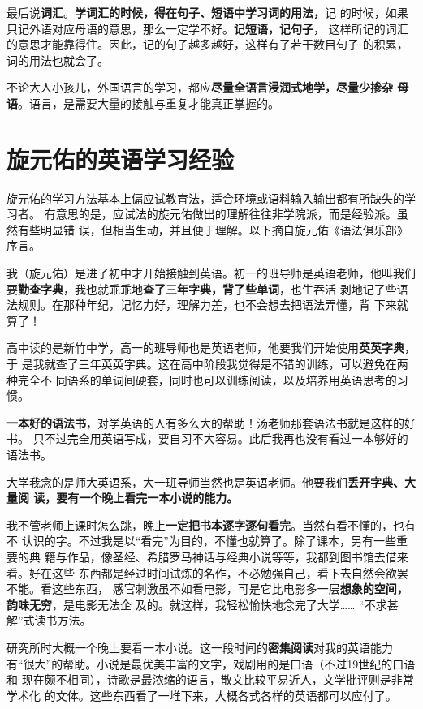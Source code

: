 最后说\textbf{词汇}。\textbf{学词汇的时候，得在句子、短语中学习词的用法，}记
的时候，如果只记外语对应母语的意思，那么一定学不好。\textbf{记短语，记句子}，
这样所记的词汇的意思才能靠得住。因此，记的句子越多越好，这样有了若干数目句子
的积累，词的用法也就会了。

不论大人小孩儿，外国语言的学习，都应\textbf{尽量全语言浸润式地学，尽量少掺杂
  母语}。语言，是需要大量的接触与重复才能真正掌握的。

\section*{旋元佑的英语学习经验}

旋元佑的学习方法基本上偏应试教育法，适合环境或语料输入输出都有所缺失的学习者。
有意思的是，应试法的旋元佑做出的理解往往非学院派，而是经验派。虽然有些明显错
误，但相当生动，并且便于理解。以下摘自旋元佑《语法俱乐部》序言。

我（旋元佑）是进了初中才开始接触到英语。初一的班导师是英语老师，他叫我们
要\textbf{勤查字典}，我也就乖乖地\textbf{查了三年字典，背了些单词}，也生吞活
剥地记了些语法规则。在那种年纪，记忆力好，理解力差，也不会想去把语法弄懂，背
下来就算了！

高中读的是新竹中学，高一的班导师也是英语老师，他要我们开始使用\textbf{英英字典}，于
是我就查了三年英英字典。这在高中阶段我觉得是不错的训练，可以避免在两种完全不
同语系的单词间硬套，同时也可以训练阅读，以及培养用英语思考的习惯。

\textbf{一本好的语法书}，对学英语的人有多么大的帮助！汤老师那套语法书就是这样的好书。
只不过完全用英语写成，要自习不大容易。此后我再也没有看过一本够好的语法书。

大学我念的是师大英语系，大一班导师当然也是英语老师。他要我们\textbf{丢开字典、大量阅
  读，要有一个晚上看完一本小说的能力。}

我不管老师上课时怎么跳，晚上\textbf{一定把书本逐字逐句看完}。当然有看不懂的，也有不
认识的字。不过我是以“看完”为目的，不懂也就算了。除了课本，另有一些重要的典
籍与作品，像圣经、希腊罗马神话与经典小说等等，我都到图书馆去借来看。好在这些
东西都是经过时间试炼的名作，不必勉强自己，看下去自然会欲罢不能。看这些东西，
感官刺激虽不如看电影，可是它比电影多一层\textbf{想象的空间，韵味无穷}，是电影无法企
及的。就这样，我轻松愉快地念完了大学…… “不求甚解”式读书方法。


研究所时大概一个晚上要看一本小说。这一段时间的\textbf{密集阅读}对我的英语能力
有“很大”的帮助。小说是最优美丰富的文字，戏剧用的是口语（不过19世纪的口语和
现在颇不相同），诗歌是最浓缩的语言，散文比较平易近人，文学批评则是非常学术化
的文体。这些东西看了一堆下来，大概各式各样的英语都可以应付了。

